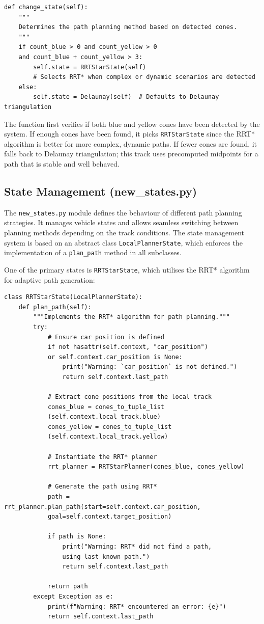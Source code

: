 \documentclass[a4paper,11pt]{report}
\begin{document}
\begin{verbatim}
def change_state(self):
    """
    Determines the path planning method based on detected cones.
    """
    if count_blue > 0 and count_yellow > 0 
    and count_blue + count_yellow > 3:
        self.state = RRTStarState(self)  
        # Selects RRT* when complex or dynamic scenarios are detected
    else:
        self.state = Delaunay(self)  # Defaults to Delaunay triangulation
\end{verbatim}

The function first verifies if both blue and yellow cones have been detected by the system.
If enough cones have been found, it picks \texttt{RRTStarState} since the RRT* algorithm is better for more complex,
dynamic paths. If fewer cones are found, it falls back to Delaunay triangulation; this track uses
precomputed midpoints for a path that is stable and well behaved.

\subsection{State Management (new\_states.py)}
The \texttt{new\_states.py} module defines the behaviour of different path planning strategies. 
It manages vehicle states and allows seamless switching between planning methods depending on the track conditions. 
The state management system is based on an abstract class \texttt{LocalPlannerState}, which enforces the implementation of a \texttt{plan\_path} method in all subclasses.

One of the primary states is \texttt{RRTStarState}, which utilises the RRT* algorithm for adaptive path generation:

\begin{verbatim}
class RRTStarState(LocalPlannerState):
    def plan_path(self):
        """Implements the RRT* algorithm for path planning."""
        try:
            # Ensure car position is defined
            if not hasattr(self.context, "car_position") 
            or self.context.car_position is None:
                print("Warning: `car_position` is not defined.")
                return self.context.last_path

            # Extract cone positions from the local track
            cones_blue = cones_to_tuple_list
            (self.context.local_track.blue)
            cones_yellow = cones_to_tuple_list
            (self.context.local_track.yellow)
            
            # Instantiate the RRT* planner
            rrt_planner = RRTStarPlanner(cones_blue, cones_yellow)
            
            # Generate the path using RRT*
            path = rrt_planner.plan_path(start=self.context.car_position, 
            goal=self.context.target_position)
            
            if path is None:
                print("Warning: RRT* did not find a path, 
                using last known path.")
                return self.context.last_path

            return path
        except Exception as e:
            print(f"Warning: RRT* encountered an error: {e}")
            return self.context.last_path
\end{verbatim}
\end{document}

